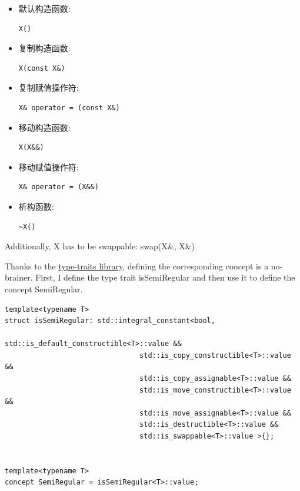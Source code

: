 \begin{itemize}
\item 
默认构造函数: 
\begin{lstlisting}[style=styleCXX]
X()
\end{lstlisting}

\item 
复制构造函数:
\begin{lstlisting}[style=styleCXX]
X(const X&)
\end{lstlisting}

\item 
复制赋值操作符: 
\begin{lstlisting}[style=styleCXX]
X& operator = (const X&)
\end{lstlisting}

\item 
移动构造函数: 
\begin{lstlisting}[style=styleCXX]
X(X&&)
\end{lstlisting}

\item 
移动赋值操作符: 
\begin{lstlisting}[style=styleCXX]
X& operator = (X&&)
\end{lstlisting}

\item 
析构函数: 
\begin{lstlisting}[style=styleCXX]
~X()
\end{lstlisting}
\end{itemize}

Additionally, X has to be swappable: swap(X\&, X\&)

Thanks to the \href{https://en.cppreference.com/w/cpp/header/type_traits}{type-traits library}, defining the corresponding concept is a no-brainer. First, I define the type trait isSemiRegular and then use it to define the concept SemiRegular.

\begin{lstlisting}[style=styleCXX]
template<typename T>
struct isSemiRegular: std::integral_constant<bool,
								std::is_default_constructible<T>::value &&
								std::is_copy_constructible<T>::value &&
								std::is_copy_assignable<T>::value &&
								std::is_move_constructible<T>::value &&
								std::is_move_assignable<T>::value &&
								std::is_destructible<T>::value &&
								std::is_swappable<T>::value >{};


template<typename T>
concept SemiRegular = isSemiRegular<T>::value;
\end{lstlisting}

